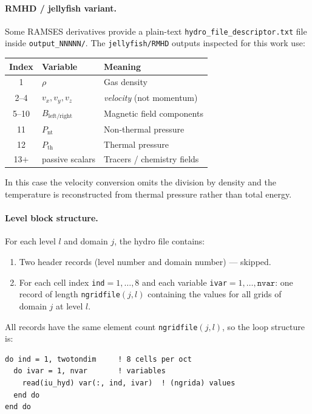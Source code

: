 \documentclass[english,a4paper]{my_memo}
\begin{document}
\paragraph{RMHD / jellyfish variant.}
Some RAMSES derivatives provide a plain-text
\texttt{hydro\_file\_descriptor.txt} file inside \texttt{output\_NNNNN/}.  The
\texttt{jellyfish/RMHD} outputs inspected for this work use:
\begin{center}
\begin{tabular}{cll}
\toprule
Index & Variable & Meaning \\
\midrule
1 & $\rho$ & Gas density \\
2--4 & $v_x, v_y, v_z$ & \emph{velocity} (not momentum) \\
5--10 & $B_\mathrm{left/right}$ & Magnetic field components \\
11 & $P_\mathrm{nt}$ & Non-thermal pressure \\
12 & $P_\mathrm{th}$ & Thermal pressure \\
13$+$ & passive scalars & Tracers / chemistry fields \\
\bottomrule
\end{tabular}
\end{center}
In this case the velocity conversion omits the division by density and the
temperature is reconstructed from thermal pressure rather than total energy.

\paragraph{Level block structure.}
For each level $l$ and domain $j$, the hydro file contains:
\begin{enumerate}
  \item Two header records (level number and domain number) — skipped.
  \item For each cell index \texttt{ind}$=1,\ldots,8$ and each variable
        \texttt{ivar}$=1,\ldots,\texttt{nvar}$: one record of length
        \texttt{ngridfile}$(j,l)$ containing the values for all grids of
        domain $j$ at level $l$.
\end{enumerate}
All records have the same element count \texttt{ngridfile}$(j,l)$, so the
loop structure is:

\begin{lstlisting}
do ind = 1, twotondim     ! 8 cells per oct
  do ivar = 1, nvar       ! variables
    read(iu_hyd) var(:, ind, ivar)  ! (ngrida) values
  end do
end do
\end{lstlisting}
\end{document}
